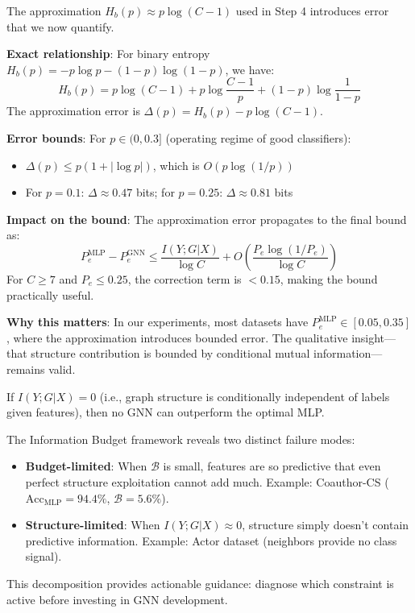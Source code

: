 \begin{remark}
\label{rem:hb_approximation}
The approximation $H_b(p) \approx p \log(C-1)$ used in Step 4 introduces error that we now quantify.

\textbf{Exact relationship}: For binary entropy $H_b(p) = -p\log p - (1-p)\log(1-p)$, we have:
\begin{equation}
    H_b(p) = p \log(C-1) + p\log\frac{C-1}{p} + (1-p)\log\frac{1}{1-p}
\end{equation}
The approximation error is $\Delta(p) = H_b(p) - p\log(C-1)$.

\textbf{Error bounds}: For $p \in (0, 0.3]$ (operating regime of good classifiers):
\begin{itemize}
    \item $\Delta(p) \leq p(1 + |\log p|)$, which is $O(p \log(1/p))$
    \item For $p = 0.1$: $\Delta \approx 0.47$ bits; for $p = 0.25$: $\Delta \approx 0.81$ bits
\end{itemize}

\textbf{Impact on the bound}: The approximation error propagates to the final bound as:
\begin{equation}
    P_e^{\text{MLP}} - P_e^{\text{GNN}} \leq \frac{I(Y; G | X)}{\log C} + O\left(\frac{P_e \log(1/P_e)}{\log C}\right)
\end{equation}
For $C \geq 7$ and $P_e \leq 0.25$, the correction term is $< 0.15$, making the bound practically useful.

\textbf{Why this matters}: In our experiments, most datasets have $P_e^{\text{MLP}} \in [0.05, 0.35]$, where the approximation introduces bounded error. The qualitative insight---that structure contribution is bounded by conditional mutual information---remains valid.
\end{remark}

\begin{corollary}
\label{cor:structure_irrelevant}
If $I(Y; G | X) = 0$ (i.e., graph structure is conditionally independent of labels given features), then no GNN can outperform the optimal MLP.
\end{corollary}

\begin{remark}
The Information Budget framework reveals two distinct failure modes:
\begin{itemize}
    \item \textbf{Budget-limited}: When $\mathcal{B}$ is small, features are so predictive that even perfect structure exploitation cannot add much. Example: Coauthor-CS ($\text{Acc}_{\text{MLP}} = 94.4\%$, $\mathcal{B} = 5.6\%$).
    \item \textbf{Structure-limited}: When $I(Y; G | X) \approx 0$, structure simply doesn't contain predictive information. Example: Actor dataset (neighbors provide no class signal).
\end{itemize}
This decomposition provides actionable guidance: diagnose which constraint is active before investing in GNN development.
\end{remark}

